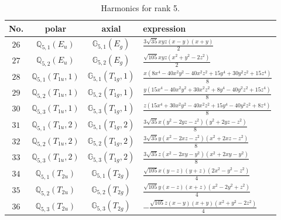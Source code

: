 \documentclass[fleqn,8pt,landscape]{jsarticle}
\begin{document}
\begin{table}[ht!]
\begin{center}
\caption{Harmonics for rank 5.}
\renewcommand{\arraystretch}{1.3}
\begin{tabular}{cccl} \hline \hline
No. & polar & axial & expression \\ \hline
$ 26 $ & $ \mathbb{Q}_{5,1}(E_{u}) $ & $ \mathbb{G}_{5,1}(E_{g}) $ & $ \frac{3 \sqrt{35} x y z \left(x - y\right) \left(x + y\right)}{2} $ \\
$ 27 $ & $ \mathbb{Q}_{5,2}(E_{u}) $ & $ \mathbb{G}_{5,2}(E_{g}) $ & $ \frac{\sqrt{105} x y z \left(x^{2} + y^{2} - 2 z^{2}\right)}{2} $ \\
$ 28 $ & $ \mathbb{Q}_{5,1}(T_{1u},1) $ & $ \mathbb{G}_{5,1}(T_{1g},1) $ & $ \frac{x \left(8 x^{4} - 40 x^{2} y^{2} - 40 x^{2} z^{2} + 15 y^{4} + 30 y^{2} z^{2} + 15 z^{4}\right)}{8} $ \\
$ 29 $ & $ \mathbb{Q}_{5,2}(T_{1u},1) $ & $ \mathbb{G}_{5,2}(T_{1g},1) $ & $ \frac{y \left(15 x^{4} - 40 x^{2} y^{2} + 30 x^{2} z^{2} + 8 y^{4} - 40 y^{2} z^{2} + 15 z^{4}\right)}{8} $ \\
$ 30 $ & $ \mathbb{Q}_{5,3}(T_{1u},1) $ & $ \mathbb{G}_{5,3}(T_{1g},1) $ & $ \frac{z \left(15 x^{4} + 30 x^{2} y^{2} - 40 x^{2} z^{2} + 15 y^{4} - 40 y^{2} z^{2} + 8 z^{4}\right)}{8} $ \\
$ 31 $ & $ \mathbb{Q}_{5,1}(T_{1u},2) $ & $ \mathbb{G}_{5,1}(T_{1g},2) $ & $ \frac{3 \sqrt{35} x \left(y^{2} - 2 y z - z^{2}\right) \left(y^{2} + 2 y z - z^{2}\right)}{8} $ \\
$ 32 $ & $ \mathbb{Q}_{5,2}(T_{1u},2) $ & $ \mathbb{G}_{5,2}(T_{1g},2) $ & $ \frac{3 \sqrt{35} y \left(x^{2} - 2 x z - z^{2}\right) \left(x^{2} + 2 x z - z^{2}\right)}{8} $ \\
$ 33 $ & $ \mathbb{Q}_{5,3}(T_{1u},2) $ & $ \mathbb{G}_{5,3}(T_{1g},2) $ & $ \frac{3 \sqrt{35} z \left(x^{2} - 2 x y - y^{2}\right) \left(x^{2} + 2 x y - y^{2}\right)}{8} $ \\
$ 34 $ & $ \mathbb{Q}_{5,1}(T_{2u}) $ & $ \mathbb{G}_{5,1}(T_{2g}) $ & $ \frac{\sqrt{105} x \left(y - z\right) \left(y + z\right) \left(2 x^{2} - y^{2} - z^{2}\right)}{4} $ \\
$ 35 $ & $ \mathbb{Q}_{5,2}(T_{2u}) $ & $ \mathbb{G}_{5,2}(T_{2g}) $ & $ \frac{\sqrt{105} y \left(x - z\right) \left(x + z\right) \left(x^{2} - 2 y^{2} + z^{2}\right)}{4} $ \\
$ 36 $ & $ \mathbb{Q}_{5,3}(T_{2u}) $ & $ \mathbb{G}_{5,3}(T_{2g}) $ & $ - \frac{\sqrt{105} z \left(x - y\right) \left(x + y\right) \left(x^{2} + y^{2} - 2 z^{2}\right)}{4} $ \\
 \hline \hline
\end{tabular}
\end{center}
\end{table}
\end{document}
